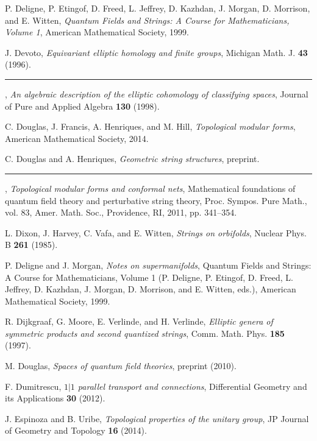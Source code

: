 \begin{description}[leftmargin=5.6em,labelwidth=5.2em,labelsep=0.4em,itemsep=0.5ex,parsep=0pt,topsep=0.8ex]
\item[\textbf{[DEF$^{+}$99]}] P. Deligne, P. Etingof, D. Freed, L. Jeffrey, D. Kazhdan, J. Morgan, D. Morrison, and E. Witten, \textit{Quantum Fields and Strings: A Course for Mathematicians, Volume 1}, American Mathematical Society, 1999.
\item[\textbf{[Dev96]}] J. Devoto, \textit{Equivariant elliptic homology and finite groups}, Michigan Math. J. \textbf{43} (1996).
\item[\textbf{[Dev98]}] \rule[0.45ex]{2.6em}{0.45pt}, \textit{An algebraic description of the elliptic cohomology of classifying spaces}, Journal of Pure and Applied Algebra \textbf{130} (1998).
\item[\textbf{[DFHH14]}] C. Douglas, J. Francis, A. Henriques, and M. Hill, \textit{Topological modular forms}, American Mathematical Society, 2014.
\item[\textbf{[DH]}] C. Douglas and A. Henriques, \textit{Geometric string structures}, preprint.
\item[\textbf{[DH11]}] \rule[0.45ex]{2.6em}{0.45pt}, \textit{Topological modular forms and conformal nets}, Mathematical foundations of quantum field theory and perturbative string theory, Proc. Sympos. Pure Math., vol. 83, Amer. Math. Soc., Providence, RI, 2011, pp. 341--354.
\item[\textbf{[DHVW85]}] L. Dixon, J. Harvey, C. Vafa, and E. Witten, \textit{Strings on orbifolds}, Nuclear Phys. B \textbf{261} (1985).
\item[\textbf{[DM99]}] P. Deligne and J. Morgan, \textit{Notes on supermanifolds}, Quantum Fields and Strings: A Course for Mathematicians, Volume 1 (P. Deligne, P. Etingof, D. Freed, L. Jeffrey, D. Kazhdan, J. Morgan, D. Morrison, and E. Witten, eds.), American Mathematical Society, 1999.
\item[\textbf{[DMVV97]}] R. Dijkgraaf, G. Moore, E. Verlinde, and H. Verlinde, \textit{Elliptic genera of symmetric products and second quantized strings}, Comm. Math. Phys. \textbf{185} (1997).
\item[\textbf{[Dou10]}] M. Douglas, \textit{Spaces of quantum field theories}, preprint (2010).
\item[\textbf{[Dum12]}] F. Dumitrescu, \textit{$1|1$ parallel transport and connections}, Differential Geometry and its Applications \textbf{30} (2012).
\item[\textbf{[EU14]}] J. Espinoza and B. Uribe, \textit{Topological properties of the unitary group}, JP Journal of Geometry and Topology \textbf{16} (2014).

\end{description}
